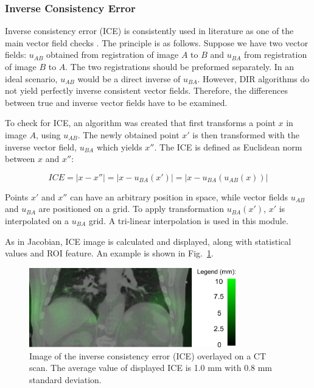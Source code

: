 \subsubsection{Inverse Consistency Error}
\label{ICE}

Inverse consistency error (ICE) is consistently used in literature as one of the main vector field checks \cite{Christensen2001, Bender2009}. The principle is as follows. Suppose we have two vector fields: $u_{AB}$ obtained from registration of image $A$ to $B$ and $u_{BA}$ from registration of image $B$ to $A$. The two registrations
should be preformed separately. In an ideal scenario, $u_{AB}$ would be a direct inverse of $u_{BA}$. However, DIR algorithms do not yield perfectly inverse consistent vector fields. Therefore, the differences between true and inverse vector fields have to be examined.


To check for ICE, an algorithm was created that first transforms a point $x$ in image $A$, using $u_{AB}$. The newly obtained point $x'$ is then transformed with the inverse vector
field, $u_{BA}$ which yields $x''$. The ICE is defined as Euclidean norm between $x$ and $x''$:

\begin{equation}
\label{eq:ice}
ICE = |x - x''| = |x - u_{BA}(x')| = |x - u_{BA}(u_{AB}(x))|
\end{equation}

Points $x'$ and $x''$ can have an arbitrary position in space, while vector fields $u_{AB}$ and $u_{BA}$ are positioned on a grid. To apply transformation $u_{BA}(x')$, $x'$ is interpolated on a $u_{BA}$ grid. A tri-linear interpolation is used in this module.

As in Jacobian, ICE image is calculated and displayed, along with statistical values and ROI feature. An example is shown in Fig.~\ref{inv}.




\begin{figure}[H]
\begin{center}
\includegraphics[width=0.8\textwidth]{./VisualMotionManagment/Images/inv.png}
\caption{Image of the inverse consistency error (ICE) overlayed on a CT scan. The average value of displayed ICE is 1.0 mm with 0.8 mm standard deviation.}
\label{inv}
\end{center}
\end{figure}


